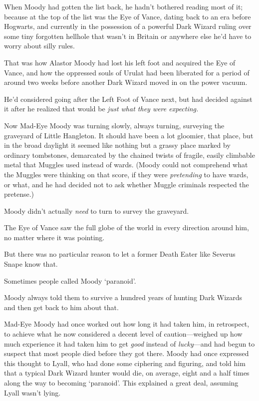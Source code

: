 When Moody had gotten the list back, he hadn't bothered reading most of it;
because at the top of the list was the Eye of Vance, dating back to an era
before Hogwarts, and currently in the possession of a powerful Dark Wizard
ruling over some tiny forgotten hellhole that wasn't in Britain or anywhere
else he'd have to worry about silly rules.

That was how Alastor Moody had lost his left foot and acquired the Eye of
Vance, and how the oppressed souls of Urulat had been liberated for a period of
around two weeks before another Dark Wizard moved in on the power vacuum.

He'd considered going after the Left Foot of Vance next, but had decided
against it after he realized that would be \emph{just what they were expecting.}

Now Mad-Eye Moody was turning slowly, always turning, surveying the graveyard
of Little Hangleton. It should have been a lot gloomier, that place, but in the
broad daylight it seemed like nothing but a grassy place marked by ordinary
tombstones, demarcated by the chained twists of fragile, easily climbable metal
that Muggles used instead of wards. (Moody could not comprehend what the
Muggles were thinking on that score, if they were \emph{pretending} to have
wards, or what, and he had decided not to ask whether Muggle criminals
respected the pretense.)

Moody didn't actually \emph{need} to turn to survey the graveyard.

The Eye of Vance saw the full globe of the world in every direction around him,
no matter where it was pointing.

But there was no particular reason to let a former Death Eater like Severus
Snape know that.

Sometimes people called Moody `paranoid'.

Moody always told them to survive a hundred years of hunting Dark Wizards and
then get back to him about that.

Mad-Eye Moody had once worked out how long it had taken him, in retrospect, to
achieve what he now considered a decent level of caution---weighed up how much
experience it had taken him to get \emph{good} instead of \emph{lucky}---and
had begun to suspect that most people died before they got there. Moody had
once expressed this thought to Lyall, who had done some ciphering and figuring,
and told him that a typical Dark Wizard hunter would die, on average, eight and
a half times along the way to becoming `paranoid'. This explained a great deal,
assuming Lyall wasn't lying.

